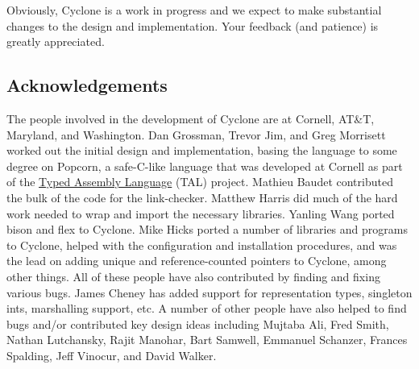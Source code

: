 Obviously, Cyclone is a work in progress and we expect to make
substantial changes to the design and implementation.  Your feedback
(and patience) is greatly appreciated.

\subsection{Acknowledgements}

The people involved in the development of Cyclone are at Cornell, 
AT\&T\@, Maryland, and Washington.  Dan Grossman, Trevor Jim, and Greg Morrisett worked out the
initial design and implementation, basing the language to some degree
on Popcorn, a safe-C-like language that was developed at Cornell as
part of the
\href{http://www.cs.cornell.edu/talc}{Typed Assembly Language} (TAL)
project.  Mathieu Baudet contributed the bulk of the code for the
link-checker.  Matthew Harris did much of the hard work needed to
wrap and import the necessary libraries.  Yanling Wang ported bison and
flex to Cyclone.  Mike Hicks ported a number of libraries and programs
to Cyclone, helped with the configuration and installation procedures,
and was the lead on adding unique and reference-counted pointers to
Cyclone, among other things.  All of these people have also contributed by finding
and fixing various bugs.  James Cheney has added support for 
representation types, singleton ints, marshalling support, etc.
A number of other people have also helped
to find bugs and/or contributed key design ideas including 
Mujtaba Ali, Fred Smith, Nathan Lutchansky, Rajit Manohar, Bart Samwell, 
Emmanuel Schanzer, Frances Spalding,
Jeff Vinocur, and David Walker.  

